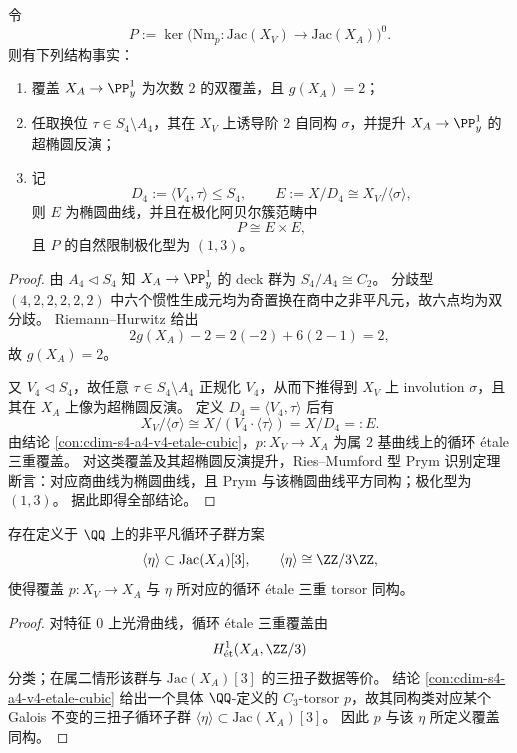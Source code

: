 \begin{conclusion}\label{con:cdim-s4-a4-v4-prym-e-square}
令
\[
P:=\ker\!\bigl(\mathrm{Nm}_{p}:\mathrm{Jac}(X_V)\to\mathrm{Jac}(X_A)\bigr)^0.
\]
则有下列结构事实：
\begin{enumerate}
  \item 覆盖 \(X_A\to\PP^1_y\) 为次数 \(2\) 的双覆盖，且 \(g(X_A)=2\)；
  \item 任取换位 \(\tau\in S_4\setminus A_4\)，其在 \(X_V\) 上诱导阶 \(2\) 自同构 \(\sigma\)，并提升 \(X_A\to\PP^1_y\) 的超椭圆反演；
  \item 记
  \[
  D_4:=\langle V_4,\tau\rangle\le S_4,\qquad
  E:=X/D_4\cong X_V/\langle\sigma\rangle,
  \]
  则 \(E\) 为椭圆曲线，并且在极化阿贝尔簇范畴中
  \[
  P\cong E\times E,
  \]
  且 \(P\) 的自然限制极化型为 \((1,3)\)。
\end{enumerate}
\end{conclusion}
\begin{proof}
由 \(A_4\lhd S_4\) 知 \(X_A\to\PP^1_y\) 的 deck 群为 \(S_4/A_4\cong C_2\)。
分歧型 \((4,2,2,2,2,2)\) 中六个惯性生成元均为奇置换在商中之非平凡元，故六点均为双分歧。
Riemann--Hurwitz 给出
\[
2g(X_A)-2=2(-2)+6(2-1)=2,
\]
故 \(g(X_A)=2\)。

又 \(V_4\lhd S_4\)，故任意 \(\tau\in S_4\setminus A_4\) 正规化 \(V_4\)，从而下推得到 \(X_V\) 上 involution \(\sigma\)，且其在 \(X_A\) 上像为超椭圆反演。
定义 \(D_4=\langle V_4,\tau\rangle\) 后有
\[
X_V/\langle\sigma\rangle\cong X/(V_4\cdot\langle\tau\rangle)=X/D_4=:E.
\]
由结论 \ref{con:cdim-s4-a4-v4-etale-cubic}，\(p:X_V\to X_A\) 为属 \(2\) 基曲线上的循环 étale 三重覆盖。
对这类覆盖及其超椭圆反演提升，Ries--Mumford 型 Prym 识别定理断言：对应商曲线为椭圆曲线，且 Prym 与该椭圆曲线平方同构；极化型为 \((1,3)\)。
据此即得全部结论。
\end{proof}

\begin{conclusion}\label{con:cdim-s4-a4-v4-jacobian-3torsor}
存在定义于 \(\QQ\) 上的非平凡循环子群方案
\[
\langle\eta\rangle\subset \mathrm{Jac}(X_A)[3],\qquad
\langle\eta\rangle\cong \ZZ/3\ZZ,
\]
使得覆盖 \(p:X_V\to X_A\) 与 \(\eta\) 所对应的循环 étale 三重 torsor 同构。
\end{conclusion}
\begin{proof}
对特征 \(0\) 上光滑曲线，循环 étale 三重覆盖由
\[
H^1_{\mathrm{\acute et}}(X_A,\ZZ/3)
\]
分类；在属二情形该群与 \(\mathrm{Jac}(X_A)[3]\) 的三扭子数据等价。
结论 \ref{con:cdim-s4-a4-v4-etale-cubic} 给出一个具体 \(\QQ\)-定义的 \(C_3\)-torsor \(p\)，故其同构类对应某个 Galois 不变的三扭子循环子群 \(\langle\eta\rangle\subset\mathrm{Jac}(X_A)[3]\)。
因此 \(p\) 与该 \(\eta\) 所定义覆盖同构。
\end{proof}

